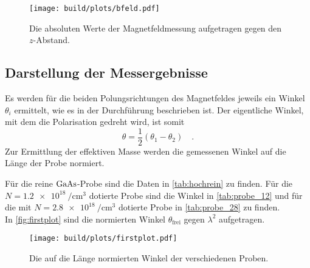     \begin{figure}[H]
        \centering
        \texttt{[image: build/plots/bfeld.pdf]}
        \caption{Die absoluten Werte der Magnetfeldmessung aufgetragen gegen den $z$-Abstand.}
        \label{fig:bfeld}
    \end{figure}

\subsection{Darstellung der Messergebnisse}

    \noindent Es werden für die beiden Polungsrichtungen des Magnetfeldes jeweils ein Winkel $\theta_i$ ermittelt, wie es in der Durchführung beschrieben ist. 
    Der eigentliche Winkel, mit dem die Polarisation gedreht wird, ist somit 
    \begin{equation*}
        \theta = \frac{1}{2}\left( \theta_1 - \theta_2\right)\quad .
    \end{equation*}
    Zur Ermittlung der effektiven Masse werden die gemessenen Winkel auf die Länge der Probe normiert. 

    \noindent Für die reine $\ce{GaAs}$-Probe sind die Daten in \autoref{tab:hochrein} zu finden. Für die $N = \SI{1.2e18}{\per\centi\metre\tothe{3}}$ dotierte 
    Probe sind die Winkel in \autoref{tab:probe_12} und für die mit $N = \SI{2.8e18}{\per\centi\metre\tothe{3}}$ dotierte Probe in \autoref{tab:probe_28} zu finden. \\
    In \autoref{fig:firstplot} sind die normierten Winkel $\theta_\text{frei}$ gegen $\lambda^2$ aufgetragen. 

    \begin{figure}[H]
        \centering
        \texttt{[image: build/plots/firstplot.pdf]}
        \caption{Die auf die Länge normierten Winkel der verschiedenen Proben.}
        \label{fig:firstplot}
    \end{figure}

